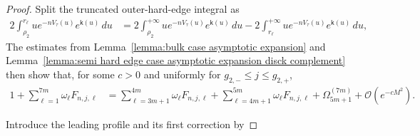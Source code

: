 \documentclass[a4paper]{article}
\numberwithin{equation}{section}
\begin{document}
\begin{proof}  
Split the truncated outer-hard-edge integral as
\begin{align*}
2\int_{\rho_2}^{r_{\ell}}ue^{-nV_{\tau}(u)}e^{\mathsf{k}(u)}\,du
&=
2\int_{\rho_2}^{+\infty}ue^{-nV_{\tau}(u)}e^{\mathsf{k}(u)}\,du
-2\int_{r_{\ell}}^{+\infty}ue^{-nV_{\tau}(u)}e^{\mathsf{k}(u)}\,du, 
\end{align*}
The estimates from Lemma~\ref{lemma:bulk case asymptotic expansion} and
Lemma~\ref{lemma:semi hard edge case asymptotic expansion disck complement}
then show that, for some $c>0$ and uniformly for
$g_{2,-}\le j\le g_{2,+}$,
\begin{align*}
1+\sum_{\ell=1}^{7m}\omega_{\ell}F_{n,j,\ell}
&=
\sum_{\ell=3m+1}^{4m}\omega_{\ell}F_{n,j,\ell}+\sum_{\ell=4m+1}^{5m}\omega_{\ell}F_{n, j,\ell}
+\Omega_{5m+1}^{(7m)}
+\mathcal{O}(e^{-cM^2}). 
\end{align*}

Introduce the leading profile and its first correction by

\end{proof}
\end{document}
